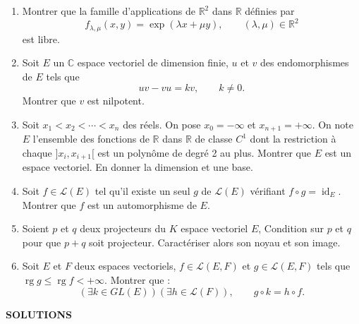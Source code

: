 \begin{enumerate}[label=\arabic*.,leftmargin=2.2em,itemsep=1.1em]
\item Montrer que la famille d'applications de $\mathbb R^2$ dans $\mathbb R$ définies par
\[
f_{\lambda,\mu}(x,y)=\exp(\lambda x+\mu y),\qquad(\lambda,\mu)\in\mathbb R^2
\]
est libre.

\item Soit $E$ un $\mathbb C$ espace vectoriel de dimension finie, $u$ et $v$ des endomorphismes de $E$ tels que
\[
uv-vu=kv,\qquad k\ne0.
\]
Montrer que $v$ est nilpotent.

\item Soit $x_1<x_2<\cdots<x_n$ des réels. On pose $x_0=-\infty$ et $x_{n+1}=+\infty$. On note $E$ l'ensemble des fonctions de $\mathbb R$ dans $\mathbb R$ de classe $C^1$ dont la restriction à chaque $]x_i,x_{i+1}[$ est un polynôme de degré 2 au plus. Montrer que $E$ est un espace vectoriel. En donner la dimension et une base.

\item Soit $f\in\mathcal L(E)$ tel qu'il existe un seul $g$ de $\mathcal L(E)$ vérifiant $f\circ g=\operatorname{id}_E$. Montrer que $f$ est un automorphisme de $E$.

\item Soient $p$ et $q$ deux projecteurs du $K$ espace vectoriel $E$,  Condition sur $p$ et $q$ pour que $p+q$ soit projecteur. Caractériser alors son noyau et son image.

\item Soit $E$ et $F$ deux espaces vectoriels, $f\in\mathcal L(E,F)$ et $g\in\mathcal L(E,F)$ tels que $\operatorname{rg}g\le\operatorname{rg}f<+\infty$. Montrer que :
\[
(\exists k\in GL(E))(\exists h\in\mathcal L(F)),\qquad g\circ k=h\circ f.
\]

\end{enumerate}

\begin{center}
{\Large\sffamily\bfseries\color{BellaLavenderDeep} SOLUTIONS}
\end{center}
\vspace{0.8em}

